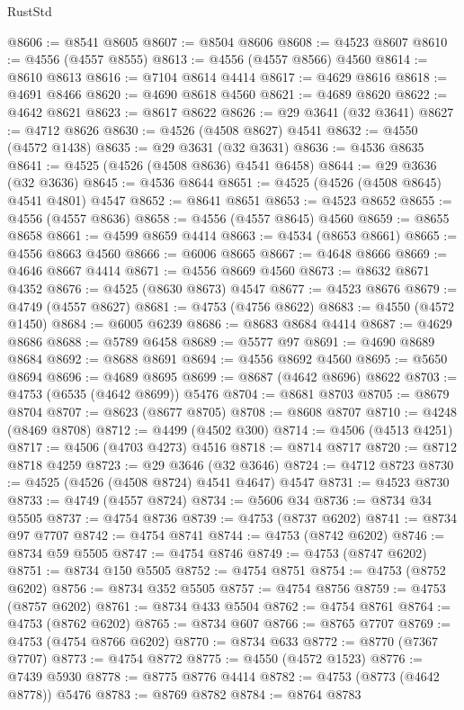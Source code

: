 \begin{lexlean}{RustStd}
\begin{coremodule}
{\begin{coremodule}
{{{{{{{{{{{{{{{{{{{{{{{{{{{{{{{{{{{{{{{{{{{{{{{{{{{{{{{@8606 := @8541 @8605
@8607 := @8504 @8606
@8608 := @4523 @8607
@8610 := @4556 (@4557 @8555)
@8613 := @4556 (@4557 @8566) @4560
@8614 := @8610 @8613
@8616 := @7104 @8614 @4414
@8617 := @4629 @8616
@8618 := @4691 @8466
@8620 := @4690 @8618 @4560
@8621 := @4689 @8620
@8622 := @4642 @8621
@8623 := @8617 @8622
@8626 := @29 @3641 (@32 @3641)
@8627 := @4712 @8626
@8630 := @4526 (@4508 @8627) @4541
@8632 := @4550 (@4572 @1438)
@8635 := @29 @3631 (@32 @3631)
@8636 := @4536 @8635
@8641 := @4525 (@4526 (@4508 @8636) @4541 @6458)
@8644 := @29 @3636 (@32 @3636)
@8645 := @4536 @8644
@8651 := @4525 (@4526 (@4508 @8645) @4541 @4801) @4547
@8652 := @8641 @8651
@8653 := @4523 @8652
@8655 := @4556 (@4557 @8636)
@8658 := @4556 (@4557 @8645) @4560
@8659 := @8655 @8658
@8661 := @4599 @8659 @4414
@8663 := @4534 (@8653 @8661)
@8665 := @4556 @8663 @4560
@8666 := @6006 @8665
@8667 := @4648 @8666
@8669 := @4646 @8667 @4414
@8671 := @4556 @8669 @4560
@8673 := @8632 @8671 @4352
@8676 := @4525 (@8630 @8673) @4547
@8677 := @4523 @8676
@8679 := @4749 (@4557 @8627)
@8681 := @4753 (@4756 @8622)
@8683 := @4550 (@4572 @1450)
@8684 := @6005 @6239
@8686 := @8683 @8684 @4414
@8687 := @4629 @8686
@8688 := @5789 @6458
@8689 := @5577 @97
@8691 := @4690 @8689 @8684
@8692 := @8688 @8691
@8694 := @4556 @8692 @4560
@8695 := @5650 @8694
@8696 := @4689 @8695
@8699 := @8687 (@4642 @8696) @8622
@8703 := @4753 (@6535 (@4642 @8699)) @5476
@8704 := @8681 @8703
@8705 := @8679 @8704
@8707 := @8623 (@8677 @8705)
@8708 := @8608 @8707
@8710 := @4248 (@8469 @8708)
@8712 := @4499 (@4502 @300)
@8714 := @4506 (@4513 @4251)
@8717 := @4506 (@4703 @4273) @4516
@8718 := @8714 @8717
@8720 := @8712 @8718 @4259
@8723 := @29 @3646 (@32 @3646)
@8724 := @4712 @8723
@8730 := @4525 (@4526 (@4508 @8724) @4541 @4647) @4547
@8731 := @4523 @8730
@8733 := @4749 (@4557 @8724)
@8734 := @5606 @34
@8736 := @8734 @34 @5505
@8737 := @4754 @8736
@8739 := @4753 (@8737 @6202)
@8741 := @8734 @97 @7707
@8742 := @4754 @8741
@8744 := @4753 (@8742 @6202)
@8746 := @8734 @59 @5505
@8747 := @4754 @8746
@8749 := @4753 (@8747 @6202)
@8751 := @8734 @150 @5505
@8752 := @4754 @8751
@8754 := @4753 (@8752 @6202)
@8756 := @8734 @352 @5505
@8757 := @4754 @8756
@8759 := @4753 (@8757 @6202)
@8761 := @8734 @433 @5504
@8762 := @4754 @8761
@8764 := @4753 (@8762 @6202)
@8765 := @8734 @607
@8766 := @8765 @7707
@8769 := @4753 (@4754 @8766 @6202)
@8770 := @8734 @633
@8772 := @8770 (@7367 @7707)
@8773 := @4754 @8772
@8775 := @4550 (@4572 @1523)
@8776 := @7439 @5930
@8778 := @8775 @8776 @4414
@8782 := @4753 (@8773 (@4642 @8778)) @5476
@8783 := @8769 @8782
@8784 := @8764 @8783
}}}}}}}}}}}}}}}}}}}}}}}}}}}}}}}}}}}}}}}}}}}}}}}}}}}}}}}
\end{coremodule}}
\end{coremodule}
\end{lexlean}
